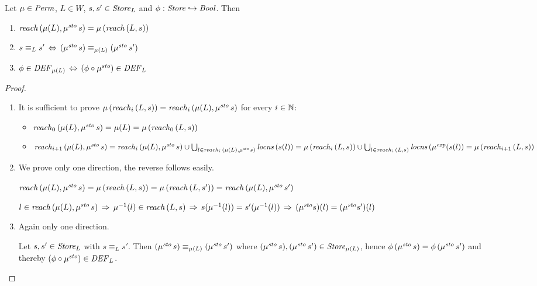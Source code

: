\documentclass[12pt,a4paper]{report}
\newcommand{\sexp}{\nstyle{exp}}
\newcommand{\ssto}{\nstyle{sto}}
\newcommand{\DEF}{\nstyle{DEF}}
\begin{document}
\begin{lemma} \label{lemma:Permutations_and_Reachability}
  Let $\mu \in \mathit{Perm}$, $L \in W$, $s,s'\in\mathit{Store}_L$ and $\phi:\mathit{Store}\hookrightarrow\mathit{Bool}$.
  Then
  \begin{enumerate}
    \item $\reach{\mu(L)}{\mu^\ssto\,s} = \mu\,(\reach{L}{s})$
    \item $s \equiv_L s' \,\Leftrightarrow\, (\mu^\ssto\,s) \equiv_{\mu(L)} (\mu^\ssto\,s')$
    \item $\phi \in \DEF_{\mu(L)} \,\Leftrightarrow\, (\phi \circ \mu^\ssto) \in \DEF_L$
  \end{enumerate}
\end{lemma}

\begin{proof} \
  \begin{enumerate}
    \item It is sufficient to prove $\mu\,(\reachn{i}{L}{s}) = \reachn{i}{\mu(L)}{\mu^\ssto\,s}$ for every $i\in\mathbb N$:
          \begin{itemize}
            \item $\reachn{0}{\mu(L)}{\mu^\ssto\,s} = \mu(L) = \mu\,(\reachn{0}{L}{s})$

            \item $\reachn{i+1}{\mu(L)}{\mu^\ssto\,s} \\
                  = \reachn{i}{\mu(L)}{\mu^\ssto\,s}
                    \cup \bigcup_{l\in\reachn{i}{\mu(L)}{\mu^\ssto\,s}} \locns{s(l)} \\
                  = \mu\,(\reachn{i}{L}{s})
                    \cup \bigcup_{l\in\reachn{i}{L}{s}} \locns{\mu^\sexp(s(l)} \\
                  = \mu\,(\reachn{i+1}{L}{s})$
          \end{itemize}

    \item We prove only one direction, the reverse follows easily.

          $\reach{\mu(L)}{\mu^\ssto\,s} = \mu\,(\reach{L}{s}) = \mu\,(\reach{L}{s'}) = \reach{\mu(L)}{\mu^\ssto\,s'}$

          $l \in \reach{\mu(L)}{\mu^\ssto\,s} \\
            \,\Rightarrow\,
            \mu^{-1}(l) \in \reach{L}{s} \\
            \,\Rightarrow\,
            s(\mu^{-1}(l)) = s'(\mu^{-1}(l)) \\
            \,\Rightarrow\,
            (\mu^\ssto s)(l) = (\mu^\ssto s')(l)$

    \item Again only one direction.

          Let $s,s'\in\mathit{Store}_L$ with $s \equiv_L s'$. Then $(\mu^\ssto\,s) \equiv_{\mu(L)} (\mu^\ssto\,s')$
          where $(\mu^\ssto\,s),(\mu^\ssto\,s')\in\Store_{\mu(L)}$, hence $\phi\,(\mu^\ssto\,s)=\phi\,(\mu^\ssto\,s')$
          and thereby $(\phi \circ \mu^\ssto) \in \DEF_L$.
  \end{enumerate}
\end{proof}
\end{document}
